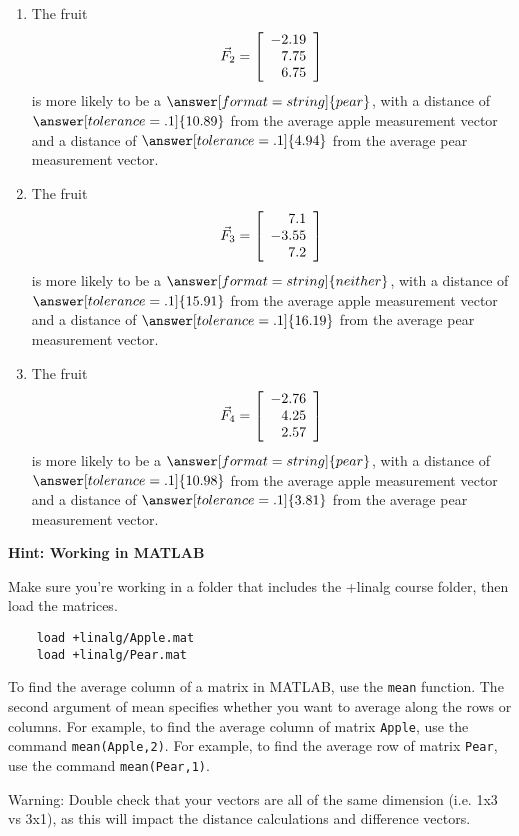 \documentclass{ximera}
\begin{document}
\begin{problem}
\begin{enumerate}
\item
The fruit
\begin{equation*}
  \vec{F}_2=\startmat{r}
    -2.19 \\
    7.75 \\
    6.75
  \stopmat
\end{equation*}
is more likely to be a $\answer[format=string]{pear}$, with a distance of $\answer[tolerance=.1]{10.89}$ from the average apple measurement vector and a distance of $\answer[tolerance=.1]{4.94}$ from the average pear measurement vector.

\item
The fruit
\begin{equation*}
  \vec{F}_3=\startmat{r}
    7.1 \\
    -3.55 \\
    7.2
  \stopmat
\end{equation*}
is more likely to be a $\answer[format=string]{neither}$, with a distance of $\answer[tolerance=.1]{15.91}$ from the average apple measurement vector and a distance of $\answer[tolerance=.1]{16.19}$ from the average pear measurement vector.

\item
The fruit
\begin{equation*}
  \vec{F}_4=\startmat{r}
    -2.76 \\
    4.25 \\
    2.57
  \stopmat
\end{equation*}
is more likely to be a $\answer[format=string]{pear}$, with a distance of $\answer[tolerance=.1]{10.98}$ from the average apple measurement vector and a distance of $\answer[tolerance=.1]{3.81}$ from the average pear measurement vector.

\end{enumerate}

{\bf Hint: Working in MATLAB}

  Make sure you're working in a folder that includes the +linalg course folder, then load the matrices.

  \begin{verbatim}
    load +linalg/Apple.mat
    load +linalg/Pear.mat
  \end{verbatim}

  To find the average column of a matrix in MATLAB, use the \texttt{mean} function. The second argument of mean specifies whether you want to average along the rows or columns. For example, to find the average column of matrix \texttt{Apple}, use the command \texttt{mean(Apple,2)}. For example, to find the average row of matrix \texttt{Pear}, use the command \texttt{mean(Pear,1)}.

  Warning: Double check that your vectors are all of the same dimension (i.e. 1x3 vs 3x1), as this will impact the distance calculations and difference vectors.



  
\end{problem}
\end{document}
